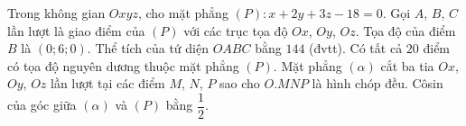 \begin{ex}
Trong không gian $Oxyz$, cho mặt phẳng $(P)\colon x+2y+3z-18=0$. Gọi $A$, $B$, $C$ lần lượt là giao điểm của $(P)$ với các trục tọa độ $Ox$, $Oy$, $Oz$.
\choiceTF
{Tọa độ của điểm $B$ là $(0;6;0)$.}
{Thể tích của tứ diện $OABC$ bằng $144$ (đvtt).}
{Có tất cả $20$ điểm có tọa độ nguyên dương thuộc mặt phẳng $(P)$.}
{Mặt phẳng $(\alpha)$ cắt ba tia $Ox$, $Oy$, $Oz$ lần lượt tại các điểm $M$, $N$, $P$ sao cho $O.MNP$ là hình chóp đều. Côsin của góc giữa $(\alpha)$ và $(P)$ bằng $\dfrac12$.}
\end{ex}
